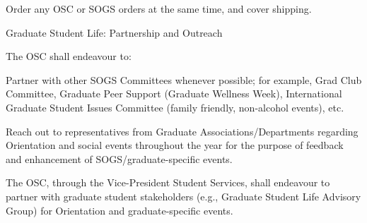 \begin{longenum}[ label*=\thesubsection.\arabic*., align=left]
\begin{longenum}[label*=\arabic*., align=left]
\begin{longenum}[label*=\arabic*., align=left]
			\item Order any OSC or SOGS orders at the same time, and cover shipping.
			\end{longenum}
		\end{longenum}
	\item Graduate Student Life: Partnership and Outreach
		\begin{longenum}[label*=\arabic*., align=left]
		\item The OSC shall endeavour to:
			\begin{longenum}[label*=\arabic*., align=left]
			\item Partner with other SOGS Committees whenever possible; for example, Grad Club Committee, Graduate Peer Support (Graduate Wellness Week), International Graduate Student Issues Committee (family friendly, non-alcohol events), etc.
			\item Reach out to representatives from Graduate Associations/Departments regarding Orientation and social events throughout the year for the purpose of feedback and enhancement of SOGS/graduate-specific events.
			\end{longenum}
		\item The OSC, through the Vice-President Student Services, shall endeavour to partner with graduate student stakeholders (e.g., Graduate Student Life Advisory Group) for Orientation and graduate-specific events.
		\end{longenum}
\end{longenum}